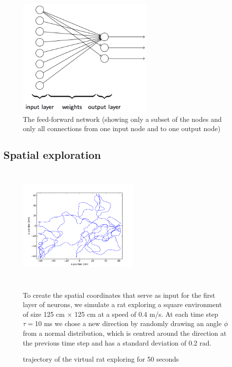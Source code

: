 \documentclass[a4paper, 12pt]{article}
\begin{document}
\begin{center}
\begin{figure}\label{overview}
\begin{center}
\includegraphics[width=0.6\textwidth]{pics/model_overview.png}
\footnotesize{\caption{The feed-forward network (showing only a subset of the nodes and only all connections from one input node and to one output node)}}
\end{center}
\end{figure}
\end{center}

\subsection{Spatial exploration}
\begin{figure}[h]
\begin{minipage}{0.4\textwidth}
	\includegraphics[width=6cm, height=6cm]{pics/running_rat.png}
	\footnotesize{\caption{trajectory of the virtual rat exploring for 50 seconds}}
\end{minipage}
\begin{minipage}{0.6\textwidth}
To create the spatial coordinates that serve as input for the first layer of neurons, we simulate a rat exploring a square environment of size 125 cm $\times$ 125 cm at a speed of 0.4 m/s. At each time step $\tau=$10 ms we chose a new direction by randomly drawing an angle $\phi$ from a normal distribution, which is centred around the direction at the previous time step and has a standard deviation of 0.2 rad.   
\end{minipage}
\end{figure}
\end{document}
